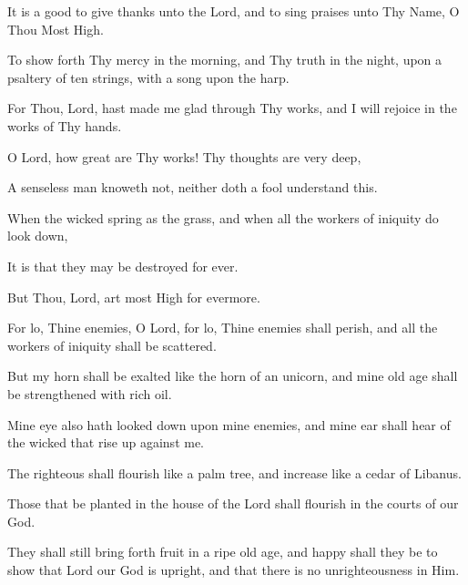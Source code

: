 It is a good to give thanks unto the Lord, and to sing praises unto Thy Name, O Thou Most High.

To show forth Thy mercy in the morning, and Thy truth in the night, upon a psaltery of ten strings, with a song upon the harp.

For Thou, Lord, hast made me glad through Thy works, and I will rejoice in the works of Thy hands.

O Lord, how great are Thy works! Thy thoughts are very deep,

A senseless man knoweth not, neither doth a fool understand this.

When the wicked spring as the grass, and when all the workers of iniquity do look down,

It is that they may be destroyed for ever.

But Thou, Lord, art most High for evermore.

For lo, Thine enemies, O Lord, for lo, Thine enemies shall perish, and all the workers of iniquity shall be scattered.

But my horn shall be exalted like the horn of an unicorn, and mine old age shall be strengthened with rich oil.

Mine eye also hath looked down upon mine enemies, and mine ear shall hear of the wicked that rise up against me.

The righteous shall flourish like a palm tree, and increase like a cedar of Libanus.

Those that be planted in the house of the Lord shall flourish in the courts of our God.

They shall still bring forth fruit in a ripe old age, and happy shall they be to show that Lord our God is upright, and that there is no unrighteousness in Him.

